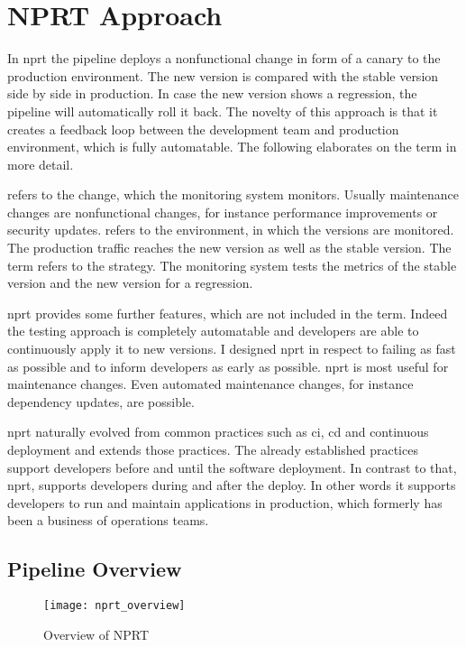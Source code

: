 \chapter{NPRT Approach}
\label{chap:macro}

In \gls{nprt} the pipeline deploys a nonfunctional change in form of a canary to the
production environment. The new version is compared with the stable version side by side
in production. In case the new version shows a regression, the pipeline will automatically
roll it back. The novelty of this approach is that it creates a feedback loop between the
development team and production environment, which is fully automatable. The following
elaborates on the term in more detail.

 refers to the change, which the monitoring system
monitors. Usually maintenance changes are nonfunctional changes, for instance performance
improvements or security updates.  refers to the environment, in which
the versions are monitored. The production traffic reaches the new version as well as the
stable version. The term  refers to the  strategy. The
monitoring system tests the metrics of the stable version and the new version for a
regression.

\gls{nprt} provides some further features, which are not included in the term. Indeed the
testing approach is completely automatable and developers are able to continuously apply
it to new versions. I designed \gls{nprt} in respect to failing as fast as possible and to
inform developers as early as possible. \gls{nprt} is most useful for maintenance
changes. Even automated maintenance changes, for instance dependency updates, are
possible.

\gls{nprt} naturally evolved from common practices such as \gls{ci}, \gls{cd} and
continuous deployment and extends those practices. The already established practices
support developers before and until the software deployment. In contrast to that,
\gls{nprt}, supports developers during and after the deploy. In other words it supports
developers to run and maintain applications in production, which formerly has been a
business of operations teams.

\section{Pipeline Overview}

\begin{figure}[htbp]
  \texttt{[image: nprt\_overview]}
  \caption{Overview of NPRT}
  \label{fig:nprt_flow}
\end{figure}

